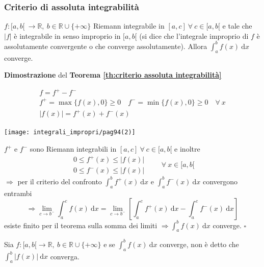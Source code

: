 \subsubsection{Criterio di assoluta integrabilità}
\begin{theorem}
	\label{th:criterio assoluta integrabilità}
	$f:[a,b[ \ \rightarrow \mathbb{R}, \ b \in \mathbb{R} \cup \{+\infty\}$ Riemann integrabile in $[a,c] \ \forall \ c \in [a,b[$ e tale che $|f|$ è integrabile in senso improprio in $[a,b[$ (si dice che l'integrale improprio di $f$ è assolutamente convergente o che converge assolutamente). Allora $\int_{a}^{b} f(x) \ \mathrm{d}x$ converge.
\end{theorem}


\begin{dembar}
	\textbf{Dimostrazione} del \textbf{Teorema \ref{th:criterio assoluta integrabilità}}
	
	\begin{gather*}
		f = f^+ - f^-
		\\
		f^+ = \max \{f(x), 0\} \geq 0 \quad f^- =\min \{f(x), 0\} \geq 0 \quad \forall \ x
		\\
		\left| f(x) \right| = f^+(x) + f^-(x)
	\end{gather*}
	\begin{center}
		\texttt{[image: integrali\_impropri/pag94(2)]}
		\label{fig:pag94}
	\end{center}

	$f^+$ e $f^-$ sono Riemann integrabili  in  $[a,c] \ \forall \ c \in [a,b[$ e inoltre
	\begin{equation*}
		\begin{array}{c}
			0 \leq f^+(x) \leq |f(x)|
			\\
			0 \leq f^-(x) \leq |f(x)|
		\end{array}
		\qquad \forall \ x \in [a,b[
	\end{equation*}
	$\Rightarrow$ per il criterio del confronto $\int_{a}^{b} f^+(x) \ \mathrm{d}x$ e $\int_{a}^{b} f^-(x) \ \mathrm{d}x$ convergono entrambi 
	\begin{equation*}
		\Rightarrow \lim_{c \rightarrow b^-} \int_{a}^{c} f(x) \ \mathrm{d}x = \lim_{c \rightarrow b^-} \left[ \int_{a}^{c}f^+(x) \ \mathrm{d}x - \int_{a}^{c}f^-(x) \ \mathrm{d}x \right]
	\end{equation*}
	esiste finito per il teorema sulla somma dei limiti $\Rightarrow \int_{a}^{b} f(x) \ \mathrm{d}x$ converge. $\square$
\end{dembar}


\begin{attbar}
	Sia $f: [a,b[ \rightarrow \mathbb{R}, \ b \in \mathbb{R} \cup \{+\infty\}$ e se $\int_{a}^{b} f(x) \ \mathrm{d}x$ converge, non è detto che $\int_{a}^{b} |f(x)| \ \mathrm{d}x$ converga.
\end{attbar}


